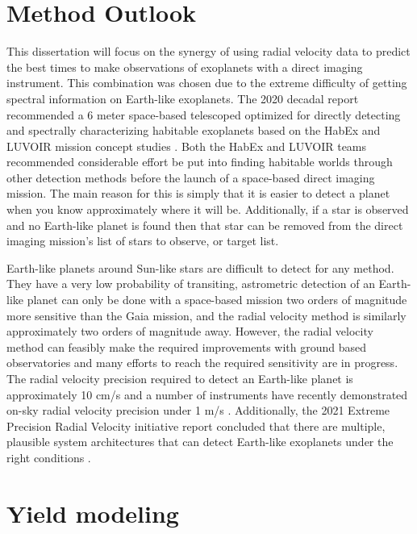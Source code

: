 \section{Method Outlook}
\label{sec:EPRV_HWO}

This dissertation will focus on the synergy of using radial velocity data to
predict the best times to make observations of exoplanets with a direct imaging
instrument. This combination was chosen due to the extreme difficulty of
getting spectral information on Earth-like exoplanets. The 2020 decadal report
recommended a 6 meter space-based telescoped optimized for directly detecting
and spectrally characterizing habitable exoplanets
\citep{nationalacademiesofsciencesPathwaysDiscoveryAstronomy2021} based on the
HabEx and LUVOIR mission concept studies
\citep{gaudiHabitableExoplanetObservatory2020,TheLUVOIRTeam2019}. Both the
HabEx and LUVOIR teams recommended considerable effort be put into finding
habitable worlds through other detection methods before the launch of a
space-based direct imaging mission. The main reason for this is simply that it
is easier to detect a planet when you know approximately where it will be.
Additionally, if a star is observed and no Earth-like planet is found then that
star can be removed from the direct imaging mission's list of stars to observe,
or target list. 

Earth-like planets around Sun-like stars are difficult to detect for any
method. They have a very low probability of transiting, astrometric detection of
an Earth-like planet can only be done with a space-based mission two orders of
magnitude more sensitive than the Gaia mission, and the radial velocity method
is similarly approximately two orders of magnitude
away\citep{gaudiHabitableExoplanetObservatory2020}. However, the radial
velocity method can feasibly make the required improvements with ground based
observatories and many efforts to reach the required sensitivity are in
progress\citep{Fischer2016a}. The radial velocity precision required to detect
an Earth-like planet is approximately 10 cm/s and a number of instruments have
recently demonstrated on-sky radial velocity precision under 1 m/s
\citep{maroonx2021, guptaTargetPrioritization2021,Pepe2021}. Additionally, the
2021 Extreme Precision Radial Velocity initiative report concluded that
there are multiple, plausible system architectures that can detect Earth-like
exoplanets under the right conditions \citep{Crass2021}.

\section{Yield modeling}
\label{sec:intro_yield_modeling}

